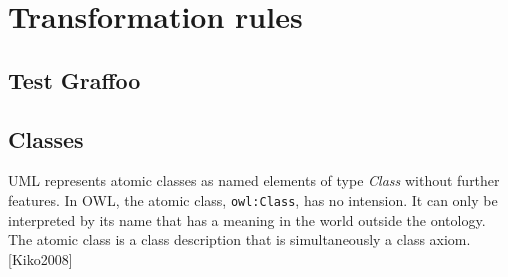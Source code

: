 \section{Transformation rules}
\label{sec:tran-rules}

\subsection{Test Graffoo}

\begin{figure}
	\centering
	\begin{tikzpicture}
	
	\end{tikzpicture}
\end{figure}

\subsection{Classes}
\label{sec:classes}

UML represents atomic classes as named elements of type \textit{Class} without further features. In OWL, the atomic class, \texttt{owl:Class}, has no intension. It can only be interpreted by its name that has a meaning in the world outside the ontology. The atomic class is a class description that is simultaneously a class axiom. [Kiko2008]



